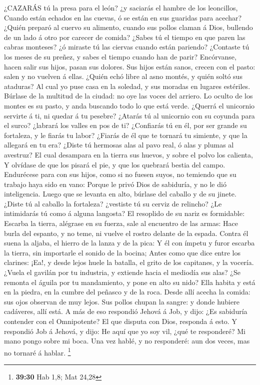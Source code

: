  ¿CAZARÁS tú la presa para el león? ¿y saciarás el hambre de
los leoncillos,  Cuando están echados en las cuevas, ó se
están en sus guaridas para acechar?  ¿Quién preparó al
cuervo su alimento, cuando sus pollos claman á Dios, bullendo de un lado
á otro por carecer de comida?  ¿Sabes tú el tiempo en que
paren las cabras monteses? ¿ó miraste tú las ciervas cuando están
pariendo?  ¿Contaste tú los meses de su preñez, y sabes el
tiempo cuando han de parir?  Encórvanse, hacen salir sus
hijos, pasan sus dolores.  Sus hijos están sanos, crecen con
el pasto: salen y no vuelven á ellas.  ¿Quién echó libre al
asno montés, y quién soltó sus ataduras?  Al cual yo puse
casa en la soledad, y sus moradas en lugares estériles. 
Búrlase de la multitud de la ciudad: no oye las voces del arriero.
 Lo oculto de los montes es su pasto, y anda buscando todo
lo que está verde.  ¿Querrá el unicornio servirte á ti, ni
quedar á tu pesebre?  ¿Atarás tú al unicornio con su
coyunda para el surco? ¿labrará los valles en pos de ti? 
¿Confiarás tú en él, por ser grande su fortaleza, y le fiarás tu labor?
 ¿Fiarás de él que te tornará tu simiente, y que la
allegará en tu era?  ¿Diste tú hermosas alas al pavo real,
ó alas y plumas al avestruz?  El cual desampara en la
tierra sus huevos, y sobre el polvo los calienta,  Y
olvídase de que los pisará el pie, y que los quebrará bestia del campo.
 Endurécese para con sus hijos, como si no fuesen suyos, no
temiendo que su trabajo haya sido en vano:  Porque le privó
Dios de sabiduría, y no le dió inteligencia.  Luego que se
levanta en alto, búrlase del caballo y de su jinete. 
¿Diste tú al caballo la fortaleza? ¿vestiste tú su cerviz de relincho?
 ¿Le intimidarás tú como á alguna langosta? El resoplido de
su nariz es formidable:  Escarba la tierra, alégrase en su
fuerza, sale al encuentro de las armas:  Hace burla del
espanto, y no teme, ni vuelve el rostro delante de la espada.
 Contra él suena la aljaba, el hierro de la lanza y de la
pica:  Y él con ímpetu y furor escarba la tierra, sin
importarle el sonido de la bocina;  Antes como que dice
entre los clarines: ¡Ea!, y desde lejos huele la batalla, el grito de
los capitanes, y la vocería.  ¿Vuela el gavilán por tu
industria, y extiende hacia el mediodía sus alas?  ¿Se
remonta el águila por tu mandamiento, y pone en alto su nido? Ella
habita y está en la piedra, en la cumbre del peñasco y de la roca. Desde
allí acecha la comida: sus ojos observan de muy lejos. Sus pollos chupan
la sangre: y donde hubiere cadáveres, allí está. A más de eso respondió
Jehová á Job, y dijo: ¿Es sabiduría contender con el Omnipotente? El que
disputa con Dios, responda á esto. Y respondió Job á Jehová, y dijo: He
aquí que yo soy vil, ¿qué te responderé? Mi mano pongo sobre mi boca.
Una vez hablé, y no responderé: aun dos veces, mas no tornaré á hablar.
\footnote{\textbf{39:30} Hab 1,8; Mat 24,28}

